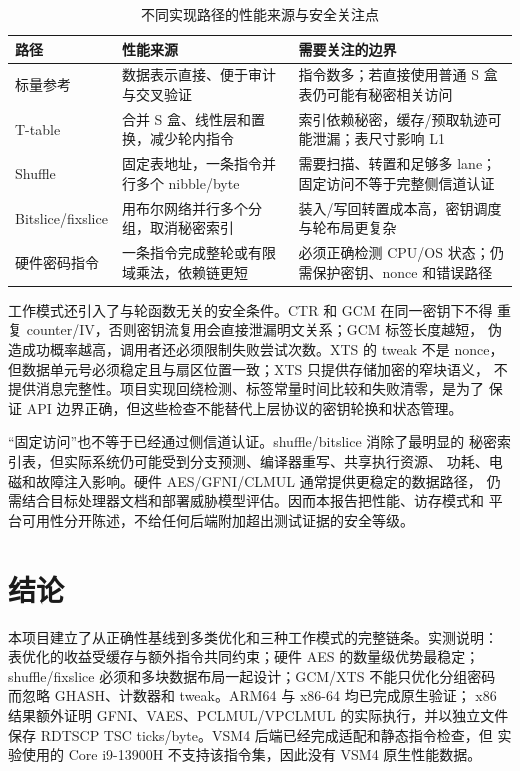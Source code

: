 \documentclass[11pt,a4paper,UTF8,fontset=none]{ctexart}
\begin{document}
\begin{table}[htbp]
\centering
\caption{不同实现路径的性能来源与安全关注点}
\begin{tabularx}{\textwidth}{lXX}
\toprule
路径 & 性能来源 & 需要关注的边界\\
\midrule
标量参考 & 数据表示直接、便于审计与交叉验证 &
指令数多；若直接使用普通 S 盒表仍可能有秘密相关访问\\
T-table & 合并 S 盒、线性层和置换，减少轮内指令 &
索引依赖秘密，缓存/预取轨迹可能泄漏；表尺寸影响 L1\\
Shuffle & 固定表地址，一条指令并行多个 nibble/byte &
需要扫描、转置和足够多 lane；固定访问不等于完整侧信道认证\\
Bitslice/fixslice & 用布尔网络并行多个分组，取消秘密索引 &
装入/写回转置成本高，密钥调度与轮布局更复杂\\
硬件密码指令 & 一条指令完成整轮或有限域乘法，依赖链更短 &
必须正确检测 CPU/OS 状态；仍需保护密钥、nonce 和错误路径\\
\bottomrule
\end{tabularx}
\end{table}

工作模式还引入了与轮函数无关的安全条件。CTR 和 GCM 在同一密钥下不得
重复 counter/IV，否则密钥流复用会直接泄漏明文关系；GCM 标签长度越短，
伪造成功概率越高，调用者还必须限制失败尝试次数。XTS 的 tweak 不是 nonce，
但数据单元号必须稳定且与扇区位置一致；XTS 只提供存储加密的窄块语义，
不提供消息完整性。项目实现回绕检测、标签常量时间比较和失败清零，是为了
保证 API 边界正确，但这些检查不能替代上层协议的密钥轮换和状态管理。

“固定访问”也不等于已经通过侧信道认证。shuffle/bitslice 消除了最明显的
秘密索引表，但实际系统仍可能受到分支预测、编译器重写、共享执行资源、
功耗、电磁和故障注入影响。硬件 AES/GFNI/CLMUL 通常提供更稳定的数据路径，
仍需结合目标处理器文档和部署威胁模型评估。因而本报告把性能、访存模式和
平台可用性分开陈述，不给任何后端附加超出测试证据的安全等级。

\FloatBarrier
\section{结论}

本项目建立了从正确性基线到多类优化和三种工作模式的完整链条。实测说明：
表优化的收益受缓存与额外指令共同约束；硬件 AES 的数量级优势最稳定；
shuffle/fixslice 必须和多块数据布局一起设计；GCM/XTS 不能只优化分组密码
而忽略 GHASH、计数器和 tweak。ARM64 与 x86-64 均已完成原生验证；
x86 结果额外证明 GFNI、VAES、PCLMUL/VPCLMUL 的实际执行，并以独立文件
保存 RDTSCP TSC ticks/byte。VSM4 后端已经完成适配和静态指令检查，但
实验使用的 Core i9-13900H 不支持该指令集，因此没有 VSM4 原生性能数据。
\end{document}
